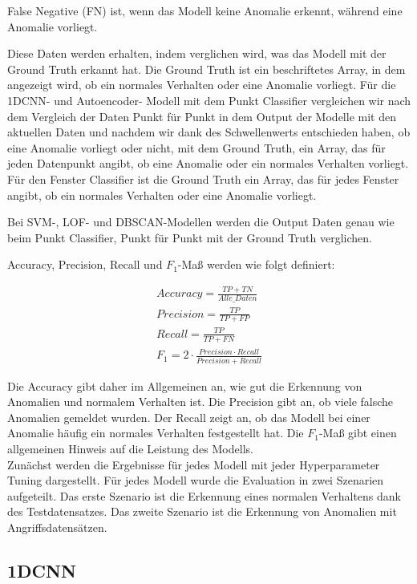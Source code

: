 \documentclass[12pt,a4paper]{scrartcl}
\numberwithin{equation}{section}
\begin{document}
False Negative (FN) ist, wenn das Modell keine Anomalie erkennt, während eine Anomalie vorliegt.

Diese Daten werden erhalten, indem verglichen wird, was das Modell mit der Ground Truth erkannt hat. Die Ground Truth ist ein beschriftetes Array, in dem angezeigt wird, ob ein normales Verhalten oder eine Anomalie vorliegt. Für die 1DCNN- und Autoencoder- Modell mit dem Punkt Classifier vergleichen wir nach dem Vergleich der Daten Punkt für Punkt in dem Output der Modelle mit den aktuellen Daten und nachdem wir dank des Schwellenwerts entschieden haben, ob eine Anomalie vorliegt oder nicht, mit dem Ground Truth, ein Array, das für jeden Datenpunkt angibt, ob eine Anomalie oder ein normales Verhalten vorliegt. Für den Fenster Classifier ist die Ground Truth ein Array, das für jedes Fenster angibt, ob ein normales Verhalten oder eine Anomalie vorliegt.

Bei SVM-, LOF- und DBSCAN-Modellen werden die Output Daten genau wie beim Punkt Classifier, Punkt für Punkt mit der Ground Truth verglichen.  

Accuracy, Precision, Recall und $ F_{1}$-Maß werden wie folgt definiert: 

\begin{align}
 	Accuracy = \frac{TP + TN}{Alle\_Daten} \\
	Precision = \frac{TP}{TP + FP} \\
	Recall = \frac{TP}{TP + FN} \\
	F_{1} = 2 \cdot \frac{Precision \cdot Recall}{Precision + Recall} 
\end{align}

Die Accuracy gibt daher im Allgemeinen an, wie gut die Erkennung von Anomalien und normalem Verhalten ist. Die Precision gibt an, ob viele falsche Anomalien gemeldet wurden. Der Recall zeigt an, ob das Modell bei einer Anomalie häufig ein normales Verhalten festgestellt hat. Die $ F_{1}$-Maß gibt einen allgemeinen Hinweis auf die Leistung des Modells. \\

Zunächst werden die Ergebnisse für jedes Modell mit jeder Hyperparameter Tuning dargestellt. Für jedes Modell wurde die Evaluation in zwei Szenarien aufgeteilt. Das erste Szenario ist die Erkennung eines normalen Verhaltens dank des Testdatensatzes. Das zweite Szenario ist die Erkennung von Anomalien mit Angriffsdatensätzen. \\

\subsection{1DCNN}
\end{document}
